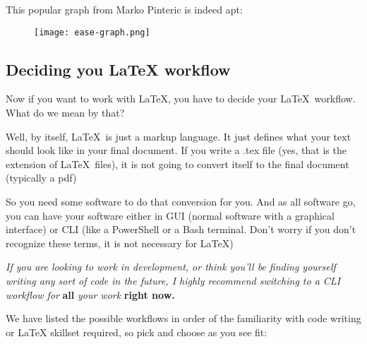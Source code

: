 \documentclass[12pt, letterpaper]{article}
\theoremstyle{remark}
\begin{document}
This popular graph from Marko Pinteric is indeed apt:
\begin{figure}[H]
\centering
\texttt{[image: ease-graph.png]}
\end{figure}

\subsection{Deciding you \LaTeX{} workflow}
Now if you want to work with \LaTeX, you have to decide your \LaTeX\, workflow. What do we mean by that?

Well, by itself, \LaTeX\, is just a markup language. It just defines what your text should look like in your final document. If you write a .tex file (yes, that is the extension of \LaTeX\, files), it is not going to convert itself to the final document (typically a pdf)

So you need some software to do that conversion for you. And as all software go, you can have your software either in GUI (normal software with a graphical interface) or CLI (like a PowerShell or a Bash terminal. Don't worry if you don't recognize these terms, it is not necessary for \LaTeX)

\textit{If you are looking to work in development, or think you'll be finding yourself writing any sort of code in the future, I highly recommend switching to a CLI workflow for} \textbf{all} \textit{ your work} \textbf{right now.}

We have listed the possible workflows in order of the familiarity with code writing or \LaTeX{} skillset required, so pick and choose as you see fit:
\end{document}
